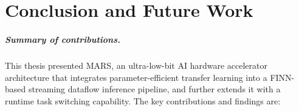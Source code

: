\documentclass[12pt, a4paper]{report}
\numberwithin{equation}{chapter}
\numberwithin{figure}{chapter}
\numberwithin{table}{chapter}
\numberwithin{algorithm}{chapter}
\begin{document}
\chapter{Conclusion and Future Work}\label{sec:future_work}

\paragraph{Summary of contributions.}

This thesis presented MARS, an ultra-low-bit AI hardware accelerator architecture that integrates parameter-efficient transfer learning into a FINN-based streaming dataflow inference pipeline, and further extends it with a runtime task switching capability. The key contributions and findings are:
\end{document}
